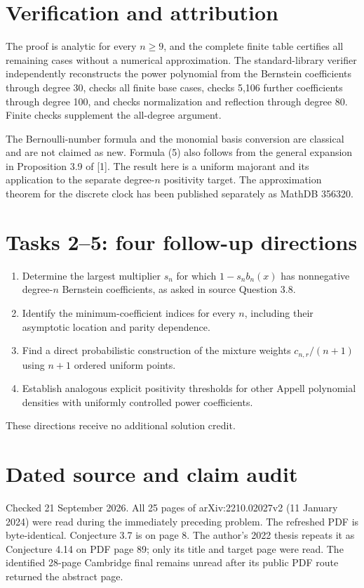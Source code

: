 \documentclass[11pt]{article}
\begin{document}
\section*{Verification and attribution}
The proof is analytic for every \(n\geq9\), and the complete finite table
certifies all remaining cases without a numerical approximation.
The standard-library verifier independently reconstructs the power
polynomial from the Bernstein coefficients through degree 30, checks
all finite base cases, checks 5,106 further coefficients through degree
100, and checks normalization and reflection through degree 80.
Finite checks supplement the all-degree argument.

The Bernoulli-number formula and the monomial basis conversion are
classical and are not claimed as new. Formula (5) also follows from the
general expansion in Proposition 3.9 of [1]. The result here is a uniform
majorant and its application to the separate degree-\(n\) positivity
target. The approximation theorem for the discrete clock has been
published separately as MathDB 356320.

\section*{Tasks 2--5: four follow-up directions}
\begin{enumerate}[start=2,leftmargin=*]
\item Determine the largest multiplier \(s_n\) for which
\(1-s_n b_n(x)\) has nonnegative degree-\(n\) Bernstein coefficients,
as asked in source Question 3.8.
\item Identify the minimum-coefficient indices for every \(n\), including
their asymptotic location and parity dependence.
\item Find a direct probabilistic construction of the mixture weights
\(c_{n,r}/(n+1)\) using \(n+1\) ordered uniform points.
\item Establish analogous explicit positivity thresholds for other
Appell polynomial densities with uniformly controlled power coefficients.
\end{enumerate}
These directions receive no additional solution credit.

\section*{Dated source and claim audit}
Checked 21 September 2026. All 25 pages of arXiv:2210.02027v2
(11 January 2024) were read during the immediately preceding problem.
The refreshed PDF is byte-identical. Conjecture 3.7 is on page 8.
The author's 2022 thesis repeats it as Conjecture 4.14 on PDF page 89;
only its title and target page were read.
The identified 28-page Cambridge final remains unread after its public
PDF route returned the abstract page.
\end{document}
